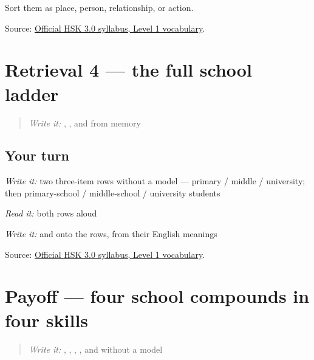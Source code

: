 Sort them as place, person, relationship, or action.

\begin{tcolorbox}[breakable,colback=teal!4,colframe=teal!35!black,title={Before you move on}]
Source: \href{https://hsk.cn-bj.ufileos.com/3.0/\%E6\%96\%B0\%E7\%89\%88HSK\%E8\%80\%83\%E8\%AF\%95\%E5\%A4\%A7\%E7\%BA\%B21219.pdf}{Official HSK 3.0 syllabus, Level 1 vocabulary}.
\end{tcolorbox}
\section[Practice]{Retrieval 4 — the full school ladder}

\label{lesson:ZH-R15-school-map-4}



\begin{quote}
\emph{Write it:} , , and  from memory
\end{quote}

\subsection*{Your turn}
\emph{Write it:} two three-item rows without a model — primary / middle / university; then primary-school / middle-school / university students

\emph{Read it:} both rows aloud

\emph{Write it:} \textbf{} and \textbf{} onto the rows, from their English meanings

\begin{tcolorbox}[breakable,colback=teal!4,colframe=teal!35!black,title={Before you move on}]
Source: \href{https://hsk.cn-bj.ufileos.com/3.0/\%E6\%96\%B0\%E7\%89\%88HSK\%E8\%80\%83\%E8\%AF\%95\%E5\%A4\%A7\%E7\%BA\%B21219.pdf}{Official HSK 3.0 syllabus, Level 1 vocabulary}.
\end{tcolorbox}
\section[Practice]{Payoff — four school compounds in four skills}

\label{lesson:ZH-C15-practice}



\begin{quote}
\emph{Write it:} , , , , and  without a model
\end{quote}

